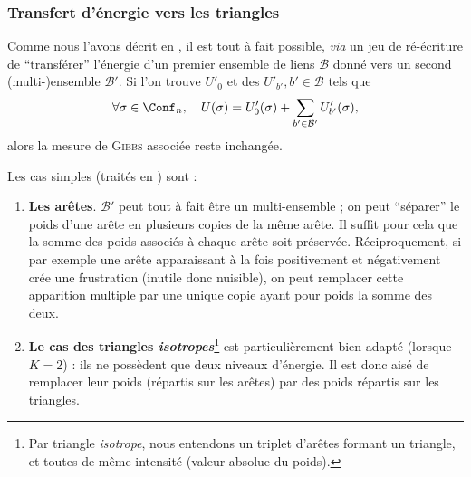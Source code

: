 \subsubsection{Transfert d'énergie vers les triangles}

Comme nous l'avons décrit en \cite{BibiMonterey}, il est tout à fait possible, \emph{via} un jeu de ré-écriture de ``transférer'' l'énergie d'un premier ensemble de liens $\mathcal B$ donné vers un second (multi-)ensemble $\mathcal B'$. Si l'on trouve $U'_0$ et des $U'_{b'}, b' \in \mathcal B$ tels que 
\[
\forall \sigma \in \Conf_n, \ \ \ U(\sigma) = U_0'(\sigma) + \sum_{b' \in \mathcal B'} U'_{b'}(\sigma),
\]
alors la mesure de \textsc{Gibbs} associée reste inchangée.

Les cas simples (traités en \cite{BibiMonterey}) sont :
\begin{enumerate}
    \item \textbf{Les arêtes}. $\mathcal B'$ peut tout à fait être un multi-ensemble ; on peut ``séparer'' le poids d'une arête en plusieurs copies de la même arête. Il suffit pour cela que la somme des poids associés à chaque arête soit préservée. Réciproquement, si par exemple une arête apparaissant à la fois positivement et négativement crée une frustration (inutile donc nuisible), on peut remplacer cette apparition multiple par une unique copie ayant pour poids la somme des deux.
    \item \textbf{Le cas des triangles \emph{isotropes}}\footnote{Par triangle \emph{isotrope}, nous entendons un triplet d'arêtes formant un triangle, et toutes de même intensité (valeur absolue du poids).}  est particulièrement bien adapté (lorsque $K=2$) : ils ne possèdent que deux niveaux d'énergie. Il est donc aisé de remplacer leur poids (répartis sur les arêtes) par des poids répartis sur les triangles.
\end{enumerate}




